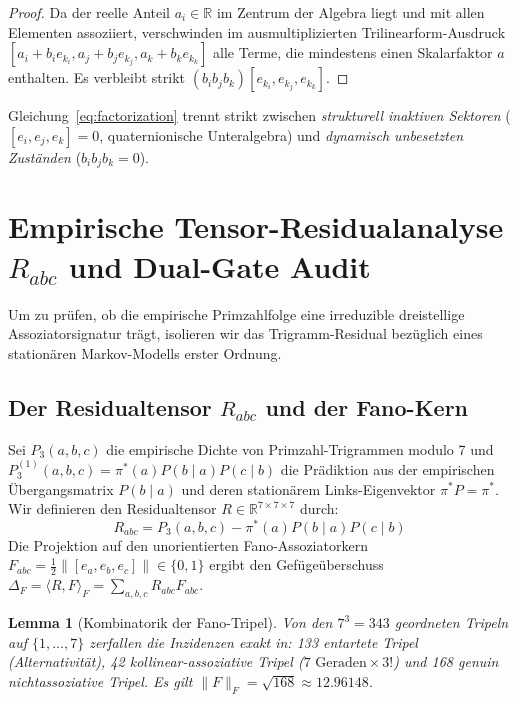 \documentclass[11pt,a4paper]{article}
\newtheorem{lemma}[theorem]{Lemma}
\theoremstyle{remark}
\begin{document}
	\begin{proof}
		Da der reelle Anteil $a_i \in \mathbb{R}$ im Zentrum der Algebra liegt und mit allen Elementen assoziiert, verschwinden im ausmultiplizierten Trilinearform-Ausdruck $[a_i + b_i e_{k_i}, a_j + b_j e_{k_j}, a_k + b_k e_{k_k}]$ alle Terme, die mindestens einen Skalarfaktor $a$ enthalten. Es verbleibt strikt $(b_i b_j b_k) [e_{k_i}, e_{k_j}, e_{k_k}]$.
	\end{proof}
	
	Gleichung~\eqref{eq:factorization} trennt strikt zwischen \emph{strukturell inaktiven Sektoren} ($[e_i,e_j,e_k] = 0$, quaternionische Unteralgebra) und \emph{dynamisch unbesetzten Zuständen} ($b_i b_j b_k = 0$).
	
	\section{Empirische Tensor-Residualanalyse $R_{abc}$ und Dual-Gate Audit}
	
	Um zu prüfen, ob die empirische Primzahlfolge eine irreduzible dreistellige Assoziatorsignatur trägt, isolieren wir das Trigramm-Residual bezüglich eines stationären Markov-Modells erster Ordnung.
	
	\subsection{Der Residualtensor $R_{abc}$ und der Fano-Kern}
	Sei $P_3(a,b,c)$ die empirische Dichte von Primzahl-Trigrammen modulo 7 und $P_3^{(1)}(a,b,c) = \pi^*(a) P(b \mid a) P(c \mid b)$ die Prädiktion aus der empirischen Übergangsmatrix $P(b \mid a)$ und deren stationärem Links-Eigenvektor $\pi^* P = \pi^*$. Wir definieren den Residualtensor $R \in \mathbb{R}^{7 \times 7 \times 7}$ durch:
	\begin{equation}
		R_{abc} = P_3(a,b,c) - \pi^*(a) P(b \mid a) P(c \mid b)
	\end{equation}
	Die Projektion auf den unorientierten Fano-Assoziatorkern $F_{abc} = \frac{1}{2} \|[e_a, e_b, e_c]\| \in \{0,1\}$ ergibt den Gefügeüberschuss $\Delta_F = \langle R, F \rangle_F = \sum_{a,b,c} R_{abc} F_{abc}$.
	
	\begin{lemma}[Kombinatorik der Fano-Tripel]
		Von den $7^3 = 343$ geordneten Tripeln auf $\{1,\dots,7\}$ zerfallen die Inzidenzen exakt in:
		133 entartete Tripel (Alternativität), 42 kollinear-assoziative Tripel ($7 \text{ Geraden} \times 3!$) und 168 genuin nichtassoziative Tripel. Es gilt $\|F\|_F = \sqrt{168} \approx 12.96148$.
	\end{lemma}
	
\end{document}
